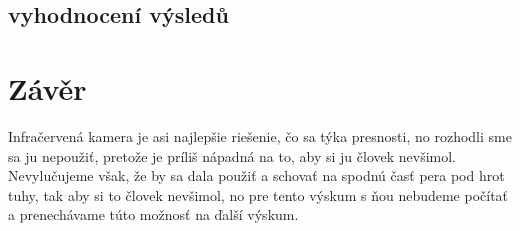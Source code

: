 \section{vyhodnocení výsledů}

\chapter{Závěr}

\label{zaver}

Infračervená kamera je asi najlepšie riešenie, čo sa týka presnosti, no rozhodli sme sa ju nepoužiť, pretože je príliš nápadná na to, aby si ju človek nevšimol. Nevylučujeme však, že by sa dala použiť a schovať na spodnú časť pera pod hrot tuhy, tak aby si to človek nevšimol, no pre tento výskum s ňou nebudeme počítať a prenechávame túto možnosť na ďalší výskum.

